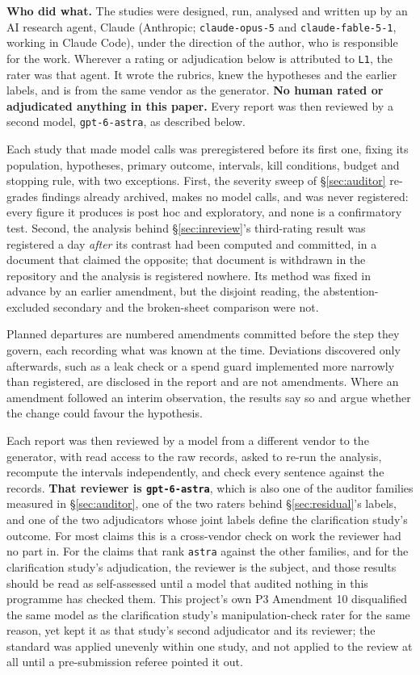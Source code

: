 \textbf{Who did what.} The studies were designed, run, analysed and written up by an AI research
agent, Claude (Anthropic; \texttt{claude-opus-5} and \texttt{claude-fable-5-1}, working in Claude
Code), under the direction of the author, who is responsible for the work. Wherever a rating or
adjudication below is attributed to \texttt{L1}, the rater was that agent. It wrote the rubrics,
knew the hypotheses and the earlier labels, and is from the same vendor as the generator.
\textbf{No human rated or adjudicated anything in this paper.} Every report was then reviewed by a
second model, \texttt{gpt-6-astra}, as described below.

Each study that made model calls was preregistered before its first one, fixing its population,
hypotheses, primary outcome, intervals, kill conditions, budget and stopping rule, with two
exceptions. First, the severity sweep of \S\ref{sec:auditor} re-grades findings already archived,
makes no model calls, and was never registered: every figure it produces is post hoc and
exploratory, and none is a confirmatory test. Second, the analysis behind
\S\ref{sec:inreview}'s third-rating result was registered a day \emph{after} its contrast had been
computed and committed, in a document that claimed the opposite; that document is withdrawn in
the repository and the analysis is registered nowhere. Its method was fixed in advance by an
earlier amendment, but the disjoint reading, the abstention-excluded secondary and the
broken-sheet comparison were not.

Planned departures are numbered amendments committed before the step they govern, each recording
what was known at the time. Deviations discovered only afterwards, such as a leak check or a spend
guard implemented more narrowly than registered, are disclosed in the report and are not
amendments. Where an amendment followed an interim observation, the results say so and argue
whether the change could favour the hypothesis.

Each report was then reviewed by a model from a different vendor to the generator, with read
access to the raw records, asked to re-run the analysis, recompute the intervals independently,
and check every sentence against the records. \textbf{That reviewer is \texttt{gpt-6-astra}},
which is also one of the auditor families measured in \S\ref{sec:auditor}, one of the two raters
behind \S\ref{sec:residual}'s labels, and one of the two adjudicators whose joint labels define
the clarification study's outcome. For most claims this is a cross-vendor check on work the
reviewer had no part in. For the claims that rank \texttt{astra} against the other families, and
for the clarification study's adjudication, the reviewer is the subject, and those results should
be read as self-assessed until a model that audited nothing in this programme has checked them.
This project's own P3 Amendment 10 disqualified the same model as the clarification study's
manipulation-check rater for the same reason, yet kept it as that study's second adjudicator and
its reviewer; the standard was applied unevenly within one study, and not applied to the review
at all until a pre-submission referee pointed it out.

